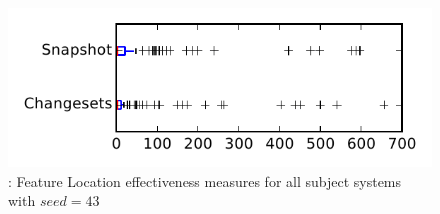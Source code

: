 
\begin{figure}
\centering
\includegraphics[height=0.4\textheight]{figures/flt_seed/rq1_tiny_43}
\caption{\rone: Feature Location effectiveness measures for all subject systems with $seed=43$}
\label{fig:flt_seed:rq1:tiny}
\end{figure}
